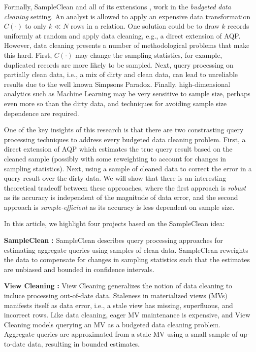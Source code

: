 Formally, SampleClean \cite{wang1999sample} and all of its extensions \cite{krishnan2015svc}, work in the \emph{budgeted data cleaning} setting. 
An analyst is allowed to apply an expensive data transformation $C(\cdot)$ to only $k\ll N$ rows in a relation.
One solution could be to draw $k$ records uniformly at random and apply data cleaning, e.g., a direct extension of AQP.
However, data cleaning presents a number of methodological problems that make this hard.
First, $C(\cdot)$ may change the sampling statistics, for example, duplicated records are more likely to be sampled.
Next, query processing on partially clean data, i.e., a mix of dirty and clean data, can lead to unreliable results due to the well known Simpsons Paradox.
Finally, high-dimensional analytics such as Machine Learning may be very sensitive to sample size, perhaps even more so than the dirty data, and techniques for avoiding sample size dependence are required.

One of the key insights of this research is that there are two constrasting query processing techniques to address every budgeted data cleaning problem.
First, a direct extension of AQP which estimates the true query result based on the cleaned sample (possibly with some reweighting to account for changes in sampling statistics). 
Next, using a sample of cleaned data to correct the error in a query result over the dirty data.
We will show that there is an interesting theoretical tradeoff between these approaches, where the first approach is \emph{robust} as its accuracy is independent of the magnitude of data error, and the second approach is \emph{sample-efficient} as its accuracy is less dependent on sample size.

In this article, we highlight four projects based on the SampleClean idea:

\vspace{0.5em}
\noindent \textbf{SampleClean \cite{wang1999sample}: } SampleClean describes query processing approaches for estimating aggregate queries using samples of clean data. SampleClean reweights the data to compensate for changes in sampling statistics such that the estimates are unbiased and bounded in confidence intervals.

\vspace{0.5em}
\noindent \textbf{View Cleaning \cite{krishnan2015svc}: } View Cleaning generalizes the notion of data cleaning to incluce processing out-of-date data. Staleness in materialized views (MVs) manifests itself as data error, i.e., a stale view has missing, superfluous, and incorrect rows.
Like data cleaning, eager MV maintenance is expensive, and View Cleaning models querying an MV as a budgeted data cleaning problem.
Aggregate queries are approximated from a stale MV using a small sample of up-to-date data, resulting in bounded estimates.

